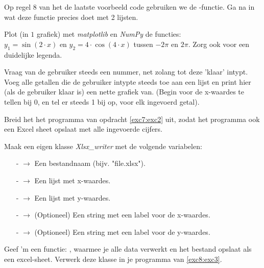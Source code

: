 \begin{exercise}
Op regel $8$ van het de laatste voorbeeld code gebruiken we de -functie. Ga na in wat deze functie precies doet met 2 lijsten. 
\end{exercise}

\begin{exercise}
Plot (in $1$ grafiek) met \textit{matplotlib} en \textit{NumPy} de functies: \\
$y_{1}=\sin(2\cdot x)$ en $y_{2}=4\cdot\cos(4\cdot x)$ tussen $-2\pi$ en $2\pi$. Zorg ook voor een duidelijke legenda.
\end{exercise}

\begin{exercise}
\label{exc7:exc2}
Vraag van de gebruiker steeds een nummer, net zolang tot deze 'klaar' intypt. \\
Voeg alle getallen die de gebruiker intypte steeds toe aan een lijst en print hier (als de gebruiker klaar is) een nette grafiek van. (Begin voor de x-waardes te tellen bij $0$, en tel er steeds 1 bij op, voor elk ingevoerd getal).
\end{exercise}

\begin{exercise}
\label{exc7:exc3}
Breid het het programma van opdracht \ref{exc7:exc2} uit, zodat het programma ook een Excel sheet opslaat met alle ingevoerde cijfers.
\end{exercise}

\begin{exercise}
Maak een eigen klasse \textit{Xlsx\_writer} met de volgende variabelen: 
\begin{itemize}
  \item[-]{   $\rightarrow$ Een bestandnaam (bijv. "file.xlsx").}
  \item[-]{ $\rightarrow$ Een lijst met x-waardes.}
  \item[-]{ $\rightarrow$ Een lijst met y-waardes.}
  \item[-]{   $\rightarrow$ (Optioneel) Een string met een label voor de x-waardes.}
  \item[-]{   $\rightarrow$ (Optioneel) Een string met een label voor de y-waardes.}
\end{itemize}

Geef 'm een functie: , waarmee je alle data verwerkt en het bestand opslaat als een excel-sheet. Verwerk deze klasse in je programma van \ref{exc8:exc3}.
\end{exercise}



